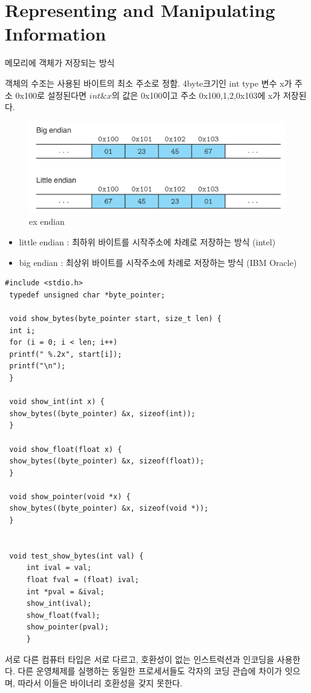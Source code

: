 \chapter{Representing and Manipulating Information}


메모리에 객체가 저장되는 방식

객체의 수조는 사용된 바이트의 최소 주소로 정함.
4byte크기인 int type 변수 x가 주소 0x100로 설정된다면 $int \&x$의 값은 0x100이고 주소 0x100,1,2,0x103에 x가 저장된다.






\begin{figure}[h!]
    \centering
    \includegraphics[scale=0.3]{pic/section1and2/pic11.png}
    \caption{ex endian}
\end{figure}


\begin{itemize}
    \item little endian :  최하위 바이트를 시작주소에 차례로 저장하는 방식 (intel)
    \item big endian : 최상위 바이트를 시작주소에 차례로 저장하는 방식 (IBM Oracle)
\end{itemize}


\begin{lstlisting}[style = CStyle]
 #include <stdio.h>
 typedef unsigned char *byte_pointer;

 void show_bytes(byte_pointer start, size_t len) {
 int i;
 for (i = 0; i < len; i++)
 printf(" %.2x", start[i]);
 printf("\n");
 }

 void show_int(int x) {
 show_bytes((byte_pointer) &x, sizeof(int));
 }

 void show_float(float x) {
 show_bytes((byte_pointer) &x, sizeof(float));
 }

 void show_pointer(void *x) {
 show_bytes((byte_pointer) &x, sizeof(void *));
 }


 void test_show_bytes(int val) {
     int ival = val;
     float fval = (float) ival;
     int *pval = &ival;
     show_int(ival);
     show_float(fval);
     show_pointer(pval);
     }

\end{lstlisting}
서로 다른 컴퓨터 타입은 서로 다르고, 호환성이 없는 인스트럭션과 인코딩을 사용한다. 다른 운영체제를 실행하는 동일한 프로세서들도 각자의 코딩 관습에 차이가 잇으며, 따라서 이들은 바이너리 호환성을 갖지 못한다.

